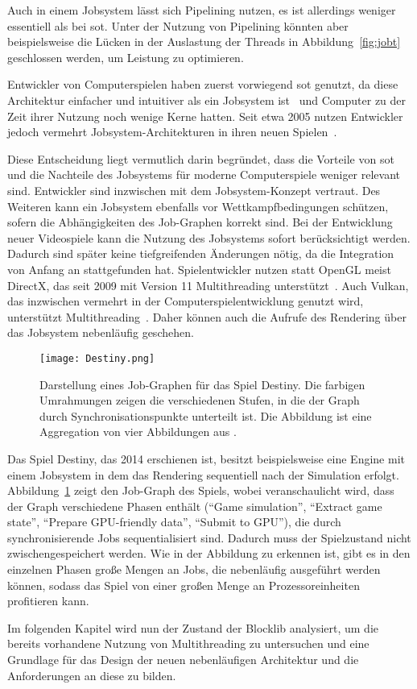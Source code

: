Auch in einem Jobsystem lässt sich Pipelining nutzen, es ist allerdings weniger essentiell als bei \ac{sot}. Unter der Nutzung von Pipelining könnten aber beispielsweise die Lücken in der Auslastung der Threads in Abbildung~\ref{fig:jobt} geschlossen werden, um Leistung zu optimieren.

Entwickler von Computerspielen haben zuerst vorwiegend \ac{sot} genutzt, da diese Architektur einfacher und intuitiver als ein Jobsystem ist~\cite{Genova2015,Tatarchuk2014} und Computer zu der Zeit ihrer Nutzung noch wenige Kerne hatten. Seit etwa 2005 nutzen Entwickler jedoch vermehrt Jobsystem-Architekturen in ihren neuen Spielen~\cite{Davies2006,Tatarchuk2014,Genova2015,Gyrling2015,Hodgman2016}.

Diese Entscheidung liegt vermutlich darin begründet, dass die Vorteile von \ac{sot} und die Nachteile des Jobsystems für moderne Computerspiele weniger relevant sind. Entwickler sind inzwischen mit dem Jobsystem-Konzept vertraut. Des Weiteren kann ein Jobsystem ebenfalls vor Wettkampfbedingungen schützen, sofern die Abhängigkeiten des Job-Graphen korrekt sind. Bei der Entwicklung neuer Videospiele kann die Nutzung des Jobsystems sofort berücksichtigt werden. Dadurch sind später keine tiefgreifenden Änderungen nötig, da die Integration von Anfang an stattgefunden hat. Spielentwickler nutzen statt OpenGL meist DirectX, das seit 2009 mit Version 11 Multithreading unterstützt~\cite{White2018}. Auch Vulkan, das inzwischen vermehrt in der Computerspielentwicklung genutzt wird, unterstützt Multithreading~\cite{Schott2016}. Daher können auch die Aufrufe des Rendering über das Jobsystem nebenläufig geschehen.

\begin{figure}
	\centering
	\texttt{[image: Destiny.png]}
	 \caption[Darstellung eines Job-Graphen für das Spiel Destiny.]{Darstellung eines Job-Graphen für das Spiel Destiny. Die farbigen Umrahmungen zeigen die verschiedenen Stufen, in die der Graph durch Synchronisationspunkte unterteilt ist. Die Abbildung ist eine Aggregation von vier Abbildungen aus \cite[S.~39~\psqq]{Tatarchuk2014}.}\label{fig:destiny-jobgraph}
\end{figure}

Das Spiel Destiny, das 2014 erschienen ist, besitzt beispielsweise eine Engine mit einem Jobsystem in dem das Rendering sequentiell nach der Simulation erfolgt. Abbildung~\ref{fig:destiny-jobgraph} zeigt den Job-Graph des Spiels, wobei veranschaulicht wird, dass der Graph verschiedene Phasen enthält (\enquote{Game simulation}, \enquote{Extract game state}, \enquote{Prepare GPU-friendly data}, \enquote{Submit to GPU}), die durch synchronisierende Jobs sequentialisiert sind. Dadurch muss der Spielzustand nicht zwischengespeichert werden. Wie in der Abbildung zu erkennen ist, gibt es in den einzelnen Phasen große Mengen an Jobs, die nebenläufig ausgeführt werden können, sodass das Spiel von einer großen Menge an Prozessoreinheiten profitieren kann.

Im folgenden Kapitel wird nun der Zustand der Blocklib analysiert, um die bereits vorhandene Nutzung von Multithreading zu untersuchen und eine Grundlage für das Design der neuen nebenläufigen Architektur und die Anforderungen an diese zu bilden.